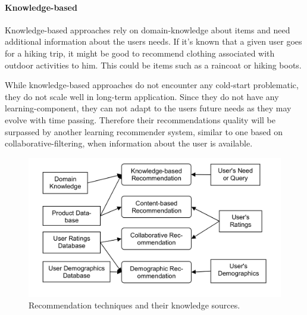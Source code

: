 \paragraph{Knowledge-based}
Knowledge-based approaches rely on domain-knowledge about items and need additional information about the users needs.
\citep[p.~12-13]{ricci:2011}
If it's known that a given user goes for a hiking trip, it might be good to recommend clothing associated with outdoor activities to him.
This could be items such as a raincoat or hiking boots.

While knowledge-based approaches do not encounter any cold-start problematic, they do not scale well in long-term application.
Since they do not have any learning-component, they can not adapt to the users future needs as they may evolve with time passing.
Therefore their recommendations quality will be surpassed by another learning recommender system, similar to one based on collaborative-filtering, when information about the user is available.
\citep[p.~12-13]{ricci:2011}

\begin{figure}[h]
    \center
    \includegraphics[scale=0.3]{inc/recommendersystems/RecommendationTechniquesAndKnowledgeSources.png}
    \caption{Recommendation techniques and their knowledge sources.\citep[p.~379]{burke:2007}}
\end{figure}

